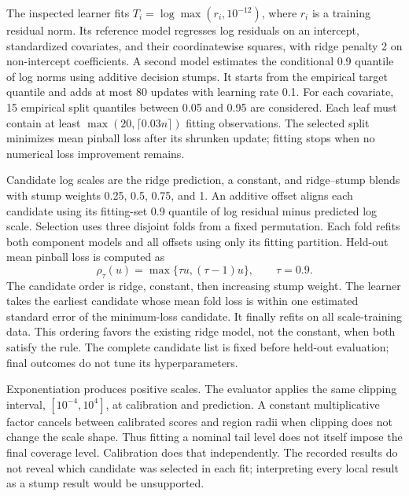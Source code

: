 \documentclass{article}
\begin{document}
The inspected learner fits $T_i=\log\max(r_i,10^{-12})$, where $r_i$ is a training residual norm. Its reference model regresses log residuals on an intercept, standardized covariates, and their coordinatewise squares, with ridge penalty 2 on non-intercept coefficients. A second model estimates the conditional 0.9 quantile of log norms using additive decision stumps. It starts from the empirical target quantile and adds at most 80 updates with learning rate 0.1. For each covariate, 15 empirical split quantiles between 0.05 and 0.95 are considered. Each leaf must contain at least $\max(20,\lceil0.03n\rceil)$ fitting observations. The selected split minimizes mean pinball loss after its shrunken update; fitting stops when no numerical loss improvement remains.

Candidate log scales are the ridge prediction, a constant, and ridge--stump blends with stump weights 0.25, 0.5, 0.75, and 1. An additive offset aligns each candidate using its fitting-set 0.9 quantile of log residual minus predicted log scale. Selection uses three disjoint folds from a fixed permutation. Each fold refits both component models and all offsets using only its fitting partition. Held-out mean pinball loss is computed as
\begin{equation}
 \rho_\tau(u)=\max\{\tau u,(\tau-1)u\},\qquad \tau=0.9.
\end{equation}
The candidate order is ridge, constant, then increasing stump weight. The learner takes the earliest candidate whose mean fold loss is within one estimated standard error of the minimum-loss candidate. It finally refits on all scale-training data. This ordering favors the existing ridge model, not the constant, when both satisfy the rule. The complete candidate list is fixed before held-out evaluation; final outcomes do not tune its hyperparameters.

Exponentiation produces positive scales. The evaluator applies the same clipping interval, $[10^{-4},10^4]$, at calibration and prediction. A constant multiplicative factor cancels between calibrated scores and region radii when clipping does not change the scale shape. Thus fitting a nominal tail level does not itself impose the final coverage level. Calibration does that independently. The recorded results do not reveal which candidate was selected in each fit; interpreting every local result as a stump result would be unsupported.
\end{document}
